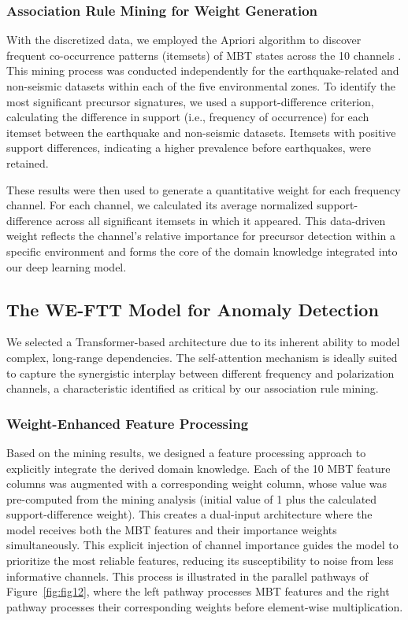 \documentclass[preprint,review,12pt,authoryear]{elsarticle}
\begin{document}
\subsubsection{Association Rule Mining for Weight Generation}\label{sec:apriori}
With the discretized data, we employed the Apriori algorithm to discover frequent co-occurrence patterns (itemsets) of MBT states across the 10 channels \citep{agrawalMiningAssociationRules1993a,hanMiningFrequentPatterns2000a}. This mining process was conducted independently for the earthquake-related and non-seismic datasets within each of the five environmental zones. To identify the most significant precursor signatures, we used a support-difference criterion, calculating the difference in support (i.e., frequency of occurrence) for each itemset between the earthquake and non-seismic datasets. Itemsets with positive support differences, indicating a higher prevalence before earthquakes, were retained.

These results were then used to generate a quantitative weight for each frequency channel. For each channel, we calculated its average normalized support-difference across all significant itemsets in which it appeared. This data-driven weight reflects the channel's relative importance for precursor detection within a specific environment and forms the core of the domain knowledge integrated into our deep learning model.

\subsection{The WE-FTT Model for Anomaly Detection}\label{sec:weftt_model}
We selected a Transformer-based architecture due to its inherent ability to model complex, long-range dependencies. The self-attention mechanism is ideally suited to capture the synergistic interplay between different frequency and polarization channels, a characteristic identified as critical by our association rule mining.

\subsubsection{Weight-Enhanced Feature Processing}\label{sec:weight_processing}
Based on the mining results, we designed a feature processing approach to explicitly integrate the derived domain knowledge. Each of the 10 MBT feature columns was augmented with a corresponding weight column, whose value was pre-computed from the mining analysis (initial value of 1 plus the calculated support-difference weight). This creates a dual-input architecture where the model receives both the MBT features and their importance weights simultaneously. This explicit injection of channel importance guides the model to prioritize the most reliable features, reducing its susceptibility to noise from less informative channels. This process is illustrated in the parallel pathways of Figure~\ref{fig:fig12}, where the left pathway processes MBT features and the right pathway processes their corresponding weights before element-wise multiplication.
\end{document}
